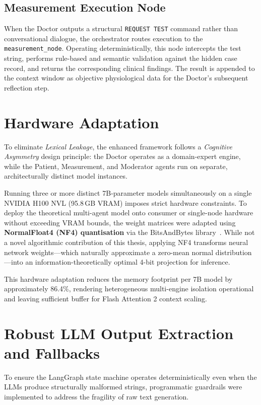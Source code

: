 \subsection{Measurement Execution Node}
When the Doctor outputs a structural \texttt{REQUEST TEST} command rather than conversational dialogue, the orchestrator routes execution to the \texttt{measurement\_node}. Operating deterministically, this node intercepts the test string, performs rule-based and semantic validation against the hidden case record, and returns the corresponding clinical findings. The result is appended to the context window as objective physiological data for the Doctor's subsequent reflection step.

\section{Hardware Adaptation}

To eliminate \textit{Lexical Leakage}, the enhanced framework follows a \textit{Cognitive Asymmetry} design principle: the Doctor operates as a domain-expert engine, while the Patient, Measurement, and Moderator agents run on separate, architecturally distinct model instances.

Running three or more distinct 7B-parameter models simultaneously on a single NVIDIA H100 NVL (95.8\,GB VRAM) imposes strict hardware constraints. To deploy the theoretical multi-agent model onto consumer or single-node hardware without exceeding VRAM bounds, the weight matrices were adapted using \textbf{NormalFloat4 (NF4) quantisation} via the BitsAndBytes library~\cite{dettmers2023qlora}. While not a novel algorithmic contribution of this thesis, applying NF4 transforms neural network weights---which naturally approximate a zero-mean normal distribution---into an information-theoretically optimal 4-bit projection for inference.

This hardware adaptation reduces the memory footprint per 7B model by approximately 86.4\%, rendering heterogeneous multi-engine isolation operational and leaving sufficient buffer for Flash Attention 2 context scaling.

\section{Robust LLM Output Extraction and Fallbacks}

To ensure the LangGraph state machine operates deterministically even when the LLMs produce structurally malformed strings, programmatic guardrails were implemented to address the fragility of raw text generation.


